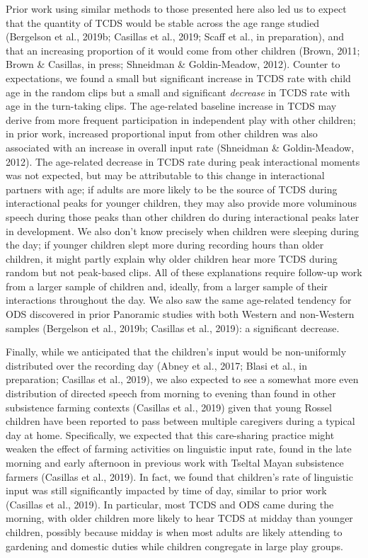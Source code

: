 \documentclass[,man,floatsintext]{apa6}
\begin{document}
Prior work using similar methods to those presented here also led us to
expect that the quantity of TCDS would be stable across the age range
studied (Bergelson et al., 2019b; Casillas et al., 2019; Scaff et al.,
in preparation), and that an increasing proportion of it would come from
other children (Brown, 2011; Brown \& Casillas, in press; Shneidman \&
Goldin-Meadow, 2012). Counter to expectations, we found a small but
significant increase in TCDS rate with child age in the random clips but
a small and significant \emph{decrease} in TCDS rate with age in the
turn-taking clips. The age-related baseline increase in TCDS may derive
from more frequent participation in independent play with other
children; in prior work, increased proportional input from other
children was also associated with an increase in overall input rate
(Shneidman \& Goldin-Meadow, 2012). The age-related decrease in TCDS
rate during peak interactional moments was not expected, but may be
attributable to this change in interactional partners with age; if
adults are more likely to be the source of TCDS during interactional
peaks for younger children, they may also provide more voluminous speech
during those peaks than other children do during interactional peaks
later in development. We also don't know precisely when children were
sleeping during the day; if younger children slept more during recording
hours than older children, it might partly explain why older children
hear more TCDS during random but not peak-based clips. All of these
explanations require follow-up work from a larger sample of children
and, ideally, from a larger sample of their interactions throughout the
day. We also saw the same age-related tendency for ODS discovered in
prior Panoramic studies with both Western and non-Western samples
(Bergelson et al., 2019b; Casillas et al., 2019): a significant
decrease.

Finally, while we anticipated that the children's input would be
non-uniformly distributed over the recording day (Abney et al., 2017;
Blasi et al., in preparation; Casillas et al., 2019), we also expected
to see a somewhat more even distribution of directed speech from morning
to evening than found in other subsistence farming contexts (Casillas et
al., 2019) given that young Rossel children have been reported to pass
between multiple caregivers during a typical day at home. Specifically,
we expected that this care-sharing practice might weaken the effect of
farming activities on linguistic input rate, found in the late morning
and early afternoon in previous work with Tseltal Mayan subsistence
farmers (Casillas et al., 2019). In fact, we found that children's rate
of linguistic input was still significantly impacted by time of day,
similar to prior work (Casillas et al., 2019). In particular, most TCDS
and ODS came during the morning, with older children more likely to hear
TCDS at midday than younger children, possibly because midday is when
most adults are likely attending to gardening and domestic duties while
children congregate in large play groups.
\end{document}
